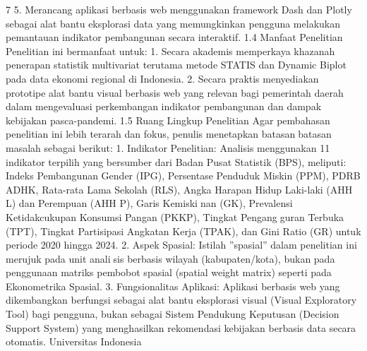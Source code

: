 7
5. Merancang aplikasi berbasis web menggunakan framework Dash dan Plotly sebagai
alat bantu eksplorasi data yang memungkinkan pengguna melakukan pemantauan
indikator pembangunan secara interaktif.
1.4 Manfaat Penelitian
Penelitian ini bermanfaat untuk:
1. Secara akademis memperkaya khazanah penerapan statistik multivariat terutama
metode STATIS dan Dynamic Biplot pada data ekonomi regional di Indonesia.
2. Secara praktis menyediakan prototipe alat bantu visual berbasis web yang relevan
bagi pemerintah daerah dalam mengevaluasi perkembangan indikator pembangunan
dan dampak kebijakan pasca-pandemi.
1.5 Ruang Lingkup Penelitian
Agar pembahasan penelitian ini lebih terarah dan fokus, penulis menetapkan batasanbatasan masalah sebagai berikut:
1. Indikator Penelitian: Analisis menggunakan 11 indikator terpilih yang bersumber
dari Badan Pusat Statistik (BPS), meliputi: Indeks Pembangunan Gender (IPG),
Persentase Penduduk Miskin (PPM), PDRB ADHK, Rata-rata Lama Sekolah (RLS),
Angka Harapan Hidup Laki-laki (AHH L) dan Perempuan (AHH P), Garis Kemiskinan (GK), Prevalensi Ketidakcukupan Konsumsi Pangan (PKKP), Tingkat Pengangguran Terbuka (TPT), Tingkat Partisipasi Angkatan Kerja (TPAK), dan Gini Ratio
(GR) untuk periode 2020 hingga 2024.
2. Aspek Spasial: Istilah ”spasial” dalam penelitian ini merujuk pada unit analisis berbasis wilayah (kabupaten/kota), bukan pada penggunaan matriks pembobot
spasial (spatial weight matrix) seperti pada Ekonometrika Spasial.
3. Fungsionalitas Aplikasi: Aplikasi berbasis web yang dikembangkan berfungsi
sebagai alat bantu eksplorasi visual (Visual Exploratory Tool) bagi pengguna, bukan
sebagai Sistem Pendukung Keputusan (Decision Support System) yang menghasilkan
rekomendasi kebijakan berbasis data secara otomatis.
Universitas Indonesia

